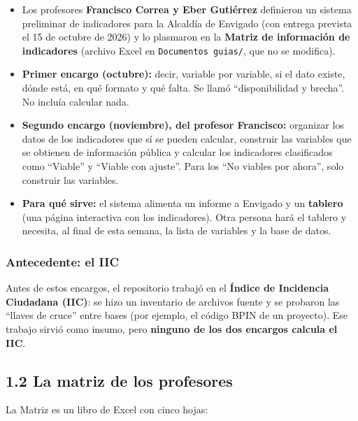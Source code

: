 \documentclass[11pt,letterpaper]{article}
\begin{document}
\begin{itemize}
\item Los profesores \textbf{Francisco Correa y Eber Gutiérrez} definieron un sistema preliminar de indicadores para la Alcaldía de Envigado (con entrega prevista el 15 de octubre de 2026) y lo plasmaron en la \textbf{Matriz de información de indicadores} (archivo Excel en \texttt{\footnotesize Documentos guias/\allowbreak{}}, que no se modifica).
\item \textbf{Primer encargo (octubre):} decir, variable por variable, si el dato existe, dónde está, en qué formato y qué falta. Se llamó ``disponibilidad y brecha''. No incluía calcular nada.
\item \textbf{Segundo encargo (noviembre), del profesor Francisco:} organizar los datos de los indicadores que sí se pueden calcular, construir las variables que se obtienen de información pública y calcular los indicadores clasificados como ``Viable'' y ``Viable con ajuste''. Para los ``No viables por ahora'', solo construir las variables.
\item \textbf{Para qué sirve:} el sistema alimenta un informe a Envigado y un \textbf{tablero} (una página interactiva con los indicadores). Otra persona hará el tablero y necesita, al final de esta semana, la lista de variables y la base de datos.
\end{itemize}

\subsubsection*{Antecedente: el IIC}

Antes de estos encargos, el repositorio trabajó en el \textbf{Índice de Incidencia Ciudadana (IIC)}: se hizo un inventario de archivos fuente y se probaron las ``llaves de cruce'' entre bases (por ejemplo, el código BPIN de un proyecto). Ese trabajo sirvió como insumo, pero \textbf{ninguno de los dos encargos calcula el IIC}.

\subsection*{1.2 La matriz de los profesores}


La Matriz es un libro de Excel con cinco hojas:
\end{document}
